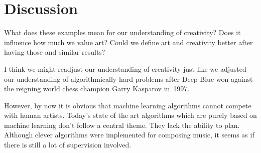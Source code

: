 
\section{Discussion}
\label{sec:discussion}

What does these examples mean for our understanding of creativity? Does it
influence how much we value art? Could we define art and creativity better
after having those and similar results?

I think we might readjust our understanding of creativity just like we adjusted
our understanding of algorithmically hard problems after Deep Blue won against
the reigning world chess champion Garry Kasparov in~1997.

However, by now it is obvious that machine learning algorithms cannot compete
with human artists. Today's state of the art algorithms which are purely based
on machine learning don't follow a central theme. They lack the ability to
plan. Although clever algorithms were implemented for composing music, it seems
as if there is still a lot of supervision involved.
